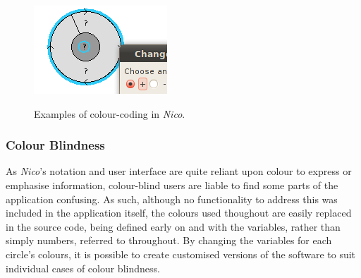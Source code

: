 \documentclass[12pt,twoside,notitlepage,xetex]{report}
\begin{document}
\begin{center}
\begin{figure}[H]
\begin{center}
{\includegraphics[width=\textwidth/3]{figs/nico_op_hi.png}
}\hspace{2cm}
\end{center}
\caption{Examples of colour-coding in \emph{Nico}.}
\label{fig:ColourCoding}
\end{figure}
\end{center}

\subsubsection{Colour Blindness}

As \emph{Nico}'s notation and user interface are quite reliant upon colour to express or emphasise information, colour-blind users are liable to find some parts of the application confusing.  As such, although no functionality to address this was included in the application itself, the colours used thoughout are easily replaced in the source code, being defined early on and with the variables, rather than simply numbers, referred to throughout.  By changing the variables for each circle's colours, it is possible to create customised versions of the software to suit individual cases of colour blindness. %
\end{document}

